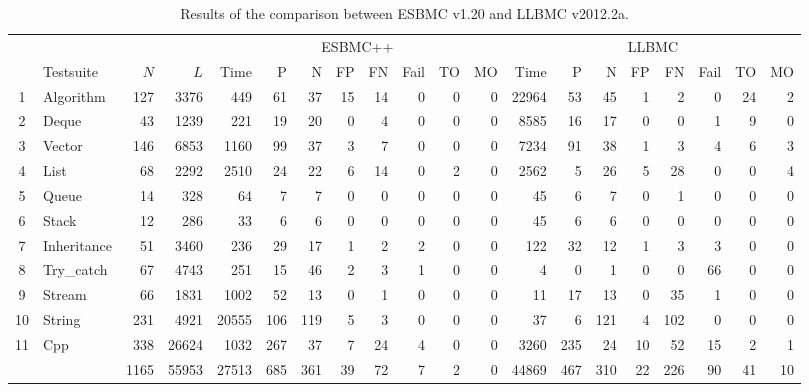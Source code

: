 \documentclass[conference]{IEEEtran}
\begin{document}
\begin{table}[t!]
\begin{adjustwidth}{-0.5cm}{}
\renewcommand\arraystretch{1.18}
\setlength{\tabcolsep}{4pt}
\begin{center} {\small
\begin{tabular}{|c|l|r|r||r|r|r|r|r|r|r|r|r|r|r|r|r|r|r|r|}
\hline
  & & & & \multicolumn{8}{c|}{ESBMC++}
        & \multicolumn{8}{c|}{LLBMC} \\  \cline{5-20}
  & Testsuite   & $N$  & $L$   & Time  & P    & N   & FP  & FN   & Fail & TO   & MO    & Time   & P   & N   & FP  & FN  & Fail & TO  & MO \\\hline
1 & Algorithm   & 127  & 3376  & 449   & 61   & 37  & 15  & 14   & 0    & 0    & 0     & 22964  & 53  & 45  & 1   & 2   & 0    & 24  & 2\\ %
\hline
2 & Deque       & 43   & 1239  & 221   & 19   & 20  & 0   & 4    & 0    & 0    & 0     & 8585   & 16  & 17  & 0   & 0   & 1    & 9   & 0\\ %
\hline
3 & Vector      & 146  & 6853  & 1160  & 99   & 37  & 3   & 7    & 0    & 0    & 0     & 7234   & 91  & 38  & 1   & 3   & 4    & 6   & 3\\ %
\hline
4 & List        & 68   & 2292  & 2510  & 24   & 22  & 6   & 14   & 0    & 2    & 0     & 2562   & 5   & 26  & 5   & 28  & 0    & 0   & 4\\ %
\hline
5 & Queue       & 14   & 328   & 64    & 7    & 7   & 0   & 0    & 0    & 0    & 0     & 45     & 6   & 7   & 0   & 1   & 0    & 0   & 0\\ %
\hline
6 & Stack       & 12   & 286   & 33    & 6    & 6   & 0   & 0    & 0    & 0    & 0     & 45     & 6   & 6   & 0   & 0   & 0    & 0   & 0\\ %
\hline
7 & Inheritance & 51   & 3460  & 236   & 29   & 17  & 1   & 2    & 2    & 0    & 0     & 122    & 32  & 12  & 1   & 3   & 3    & 0   & 0\\ %
\hline
8 & Try\_catch  & 67   & 4743  & 251   & 15   & 46  & 2   & 3    & 1    & 0    & 0     & 4      & 0   & 1   & 0   & 0   & 66   & 0   & 0 \\ %
\hline
9 & Stream      & 66   & 1831  & 1002  & 52   & 13  & 0   & 1    & 0    & 0    & 0     & 11     & 17  & 13  & 0   & 35  & 1    & 0   & 0\\ %
\hline
10 & String     & 231  & 4921  & 20555 & 106  & 119 & 5   & 3    & 0    & 0    & 0     & 37     & 6   & 121 & 4   & 102 & 0    & 0   & 0\\ %
\hline
11 & Cpp        & 338  & 26624 & 1032  & 267  & 37  & 7   & 24   & 4    & 0    & 0     & 3260   & 235 & 24  & 10  & 52  & 15   & 2   & 1\\ %
\hline\hline
  &             & 1165 & 55953 & 27513 & 685  & 361   & 39   & 72  & 7  & 2    & 0     & 44869  & 467 & 310 & 22  & 226 & 90   & 41  & 10\\ %
\hline
\end{tabular} }
\end{center}
\caption{Results of the comparison between ESBMC v1.20 and LLBMC v2012.2a.} 
\label{table:results-of-the-comparison-between-ESBMC-and-LLBMC}
\end{adjustwidth}
\end{table}
\end{document}
